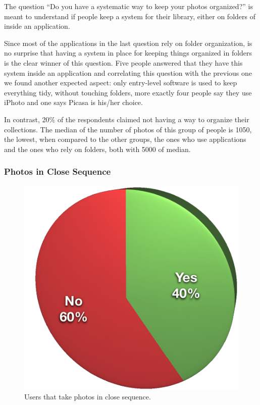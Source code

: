 The question ``Do you have a systematic way to keep your photos organized?'' is meant to understand if people keep a system for their library, either on folders of inside an application.

Since most of the applications in the last question rely on folder organization, is no surprise that having a system in place for keeping things organized in folders is the clear winner of this question. Five people answered that they have this system inside an application and correlating this question with the previous one we found another expected aspect: only entry-level software is used to keep everything tidy, without touching folders, more exactly four people say they use iPhoto and one says Picasa is his/her choice.

In contrast, 20\% of the respondents claimed not having a way to organize their collections. The median of the number of photos of this group of people is 1050, the lowest, when compared to the other groups, the ones who use applications and the ones who rely on folders, both with 5000 of median.




\subsubsection{Photos in Close Sequence} %
\label{ssub:photos_in_close_sequence}

\begin{figure}
	\vspace{-50pt}
	\begin{center}
		\includegraphics[width=\linewidth]{Figures/survey/close-seq}
	\end{center}
	\vspace{-20pt}
	\caption{Users that take photos in close sequence.}
	\vspace{-5pt}
	\label{fig:us:close-seq}
\end{figure}


